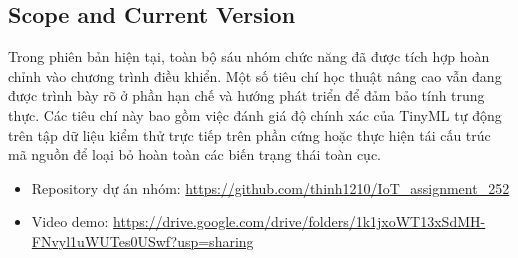\subsection{Scope and Current Version}
Trong phiên bản hiện tại, toàn bộ sáu nhóm chức năng đã được tích hợp hoàn chỉnh vào chương trình điều khiển. Một số tiêu chí học thuật nâng cao vẫn đang được trình bày rõ ở phần hạn chế và hướng phát triển để đảm bảo tính trung thực. Các tiêu chí này bao gồm việc đánh giá độ chính xác của TinyML tự động trên tập dữ liệu kiểm thử trực tiếp trên phần cứng hoặc thực hiện tái cấu trúc mã nguồn để loại bỏ hoàn toàn các biến trạng thái toàn cục.

\begin{itemize}
    \item Repository dự án nhóm: \url{https://github.com/thinh1210/IoT_assignment_252}
    \item Video demo: \url{https://drive.google.com/drive/folders/1k1jxoWT13xSdMH-FNvyl1uWUTes0USwf?usp=sharing}
\end{itemize}
